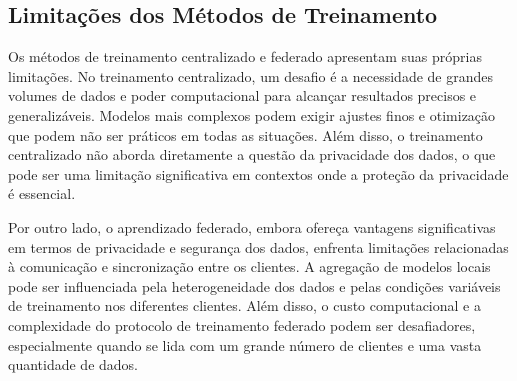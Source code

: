 \subsection{Limitações dos Métodos de Treinamento}

Os métodos de treinamento centralizado e federado apresentam suas próprias limitações. No treinamento centralizado, um desafio é a necessidade de grandes volumes de dados e poder computacional para alcançar resultados precisos e generalizáveis. Modelos mais complexos podem exigir ajustes finos e otimização que podem não ser práticos em todas as situações. Além disso, o treinamento centralizado não aborda diretamente a questão da privacidade dos dados, o que pode ser uma limitação significativa em contextos onde a proteção da privacidade é essencial.

Por outro lado, o aprendizado federado, embora ofereça vantagens significativas em termos de privacidade e segurança dos dados, enfrenta limitações relacionadas à comunicação e sincronização entre os clientes. A agregação de modelos locais pode ser influenciada pela heterogeneidade dos dados e pelas condições variáveis de treinamento nos diferentes clientes. Além disso, o custo computacional e a complexidade do protocolo de treinamento federado podem ser desafiadores, especialmente quando se lida com um grande número de clientes e uma vasta quantidade de dados.